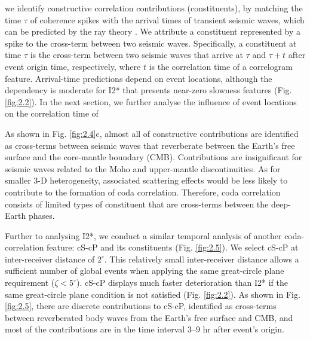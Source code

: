  we identify constructive correlation contributions (constituents), by matching the time $\tau$ of coherence spikes  with the arrival times of transient seismic waves, which can be predicted by the ray theory \citep[e.g.,][]{buland_computation_1983}. We attribute a constituent represented by a spike to the cross-term between two seismic waves. Specifically, a constituent at time $\tau$ is the cross-term between two seismic waves that arrive at $\tau$ and $\tau+t$ after event origin time, respectively, where $t$ is the correlation time of a correlogram feature. Arrival-time predictions depend on event locations, although the dependency is moderate for I2* that presents near-zero slowness features (Fig. \ref{fig:2.2}). In the next section, we further analyse the influence of event locations on the correlation time of 



As shown in Fig. \ref{fig:2.4}c, almost all of constructive contributions are identified as cross-terms between seismic waves that reverberate between the Earth's free surface and the core-mantle boundary (CMB). Contributions are insignificant for seismic waves related to the Moho and upper-mantle discontinuities. As for smaller 3-D heterogeneity, associated scattering effects would be less likely to contribute to the formation of coda correlation. Therefore, coda correlation consists of limited types of constituent that are cross-terms between the deep-Earth phases.



Further to analysing I2*, we conduct a similar temporal analysis of another coda-correlation feature: cS-cP and its constituents (Fig. \ref{fig:2.5}). We select cS-cP at inter-receiver distance of $2^{\circ}$. This relatively small inter-receiver distance allows a sufficient number of global events when applying the same great-circle plane requirement ($\zeta<5^{\circ}$). cS-cP displays much faster deterioration than I2* if the same great-circle plane condition is not satisfied (Fig. \ref{fig:2.2}). As shown in Fig. \ref{fig:2.5}, there are discrete contributions to cS-cP, identified as cross-terms between reverberated body waves from the Earth's free surface and CMB, and most of the contributions are in the time interval 3--9 hr after event's origin.


